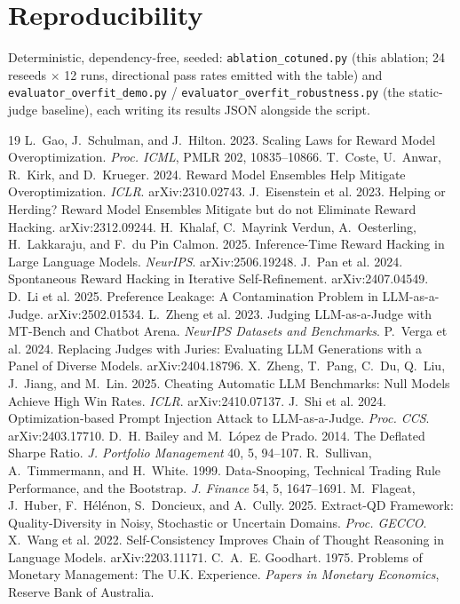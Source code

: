 \documentclass[sigconf]{acmart}
\begin{document}
\section*{Reproducibility}
Deterministic, dependency-free, seeded: \texttt{ablation\_cotuned.py} (this ablation; 24 reseeds $\times$ 12 runs, directional pass rates emitted with the table) and \texttt{evaluator\_overfit\_demo.py} / \texttt{evaluator\_overfit\_robustness.py} (the static-judge baseline), each writing its results JSON alongside the script.


\begin{thebibliography}{19}
\small
{} L.~Gao, J.~Schulman, and J.~Hilton. 2023. Scaling Laws for Reward Model Overoptimization. \emph{Proc. ICML}, PMLR 202, 10835--10866.
 T.~Coste, U.~Anwar, R.~Kirk, and D.~Krueger. 2024. Reward Model Ensembles Help Mitigate Overoptimization. \emph{ICLR}. arXiv:2310.02743.
 J.~Eisenstein et al. 2023. Helping or Herding? Reward Model Ensembles Mitigate but do not Eliminate Reward Hacking. arXiv:2312.09244.
 H.~Khalaf, C.~Mayrink Verdun, A.~Oesterling, H.~Lakkaraju, and F.~du Pin Calmon. 2025. Inference-Time Reward Hacking in Large Language Models. \emph{NeurIPS}. arXiv:2506.19248.
 J.~Pan et al. 2024. Spontaneous Reward Hacking in Iterative Self-Refinement. arXiv:2407.04549.
 D.~Li et al. 2025. Preference Leakage: A Contamination Problem in LLM-as-a-Judge. arXiv:2502.01534.
 L.~Zheng et al. 2023. Judging LLM-as-a-Judge with MT-Bench and Chatbot Arena. \emph{NeurIPS Datasets and Benchmarks}.
 P.~Verga et al. 2024. Replacing Judges with Juries: Evaluating LLM Generations with a Panel of Diverse Models. arXiv:2404.18796.
 X.~Zheng, T.~Pang, C.~Du, Q.~Liu, J.~Jiang, and M.~Lin. 2025. Cheating Automatic LLM Benchmarks: Null Models Achieve High Win Rates. \emph{ICLR}. arXiv:2410.07137.
 J.~Shi et al. 2024. Optimization-based Prompt Injection Attack to LLM-as-a-Judge. \emph{Proc. CCS}. arXiv:2403.17710.
 D.~H. Bailey and M.~L\'opez de Prado. 2014. The Deflated Sharpe Ratio. \emph{J. Portfolio Management} 40, 5, 94--107.
 R.~Sullivan, A.~Timmermann, and H.~White. 1999. Data-Snooping, Technical Trading Rule Performance, and the Bootstrap. \emph{J. Finance} 54, 5, 1647--1691.
 M.~Flageat, J.~Huber, F.~H\'el\'enon, S.~Doncieux, and A.~Cully. 2025. Extract-QD Framework: Quality-Diversity in Noisy, Stochastic or Uncertain Domains. \emph{Proc. GECCO}.
 X.~Wang et al. 2022. Self-Consistency Improves Chain of Thought Reasoning in Language Models. arXiv:2203.11171.
 C.~A.~E. Goodhart. 1975. Problems of Monetary Management: The U.K. Experience. \emph{Papers in Monetary Economics}, Reserve Bank of Australia.
\end{thebibliography}
\end{document}
